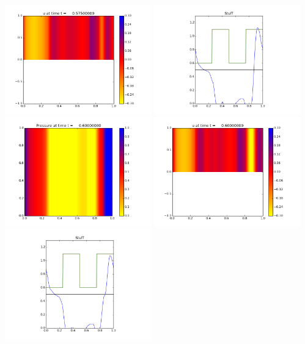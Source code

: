 \documentclass[11pt]{article}
\begin{document}
\includegraphics[width=0.475\textwidth]{frame0023fig1.png}
\vskip 10pt 
\includegraphics[width=0.475\textwidth]{frame0023fig3.png}
\vskip 10pt 
\includegraphics[width=0.475\textwidth]{frame0024fig0.png}
\includegraphics[width=0.475\textwidth]{frame0024fig1.png}
\vskip 10pt 
\includegraphics[width=0.475\textwidth]{frame0024fig3.png}
\end{document}
